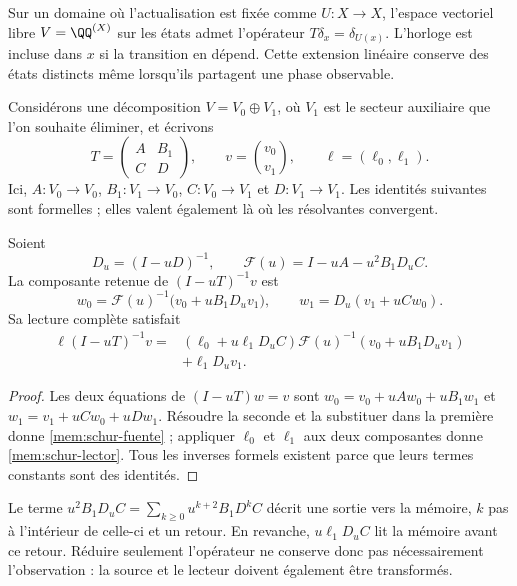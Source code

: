 Sur un domaine où l'actualisation est fixée comme \(U:X\to X\),
l'espace vectoriel libre \(V=\QQ^{(X)}\) sur les états admet l'opérateur
\(T\delta_x=\delta_{U(x)}\). L'horloge est incluse dans \(x\) si la
transition en dépend. Cette extension linéaire conserve des états
distincts même lorsqu'ils partagent une phase observable.

Considérons une décomposition \(V=V_0\oplus V_1\), où \(V_1\)
est le secteur auxiliaire que l'on souhaite éliminer, et écrivons
\[
 T=\begin{pmatrix}A&B_1\\C&D\end{pmatrix},\qquad
 v=\binom{v_0}{v_1},\qquad \ell=(\ell_0,\ell_1).
\]
Ici, \(A:V_0\to V_0\), \(B_1:V_1\to V_0\),
\(C:V_0\to V_1\) et \(D:V_1\to V_1\).
Les identités suivantes sont formelles ; elles valent également là où les
résolvantes convergent.

\begin{proposition}
\label{mem:prop-schur}
Soient
\[
 D_u=(I-uD)^{-1},\qquad
 \mathscr F(u)=I-uA-u^2B_1D_uC.
\]
La composante retenue de \((I-uT)^{-1}v\) est
\begin{equation}
 w_0=\mathscr F(u)^{-1}\bigl(v_0+uB_1D_uv_1\bigr),
 \qquad w_1=D_u(v_1+uCw_0).
 \label{mem:schur-fuente}
\end{equation}
Sa lecture complète satisfait
\begin{equation}
 \begin{split}
 \ell(I-uT)^{-1}v
 ={}&(\ell_0+u\ell_1D_uC)
       \mathscr F(u)^{-1}(v_0+uB_1D_uv_1)\\
    &+\ell_1D_uv_1.
 \end{split}
 \label{mem:schur-lector}
\end{equation}
\end{proposition}
\begin{proof}
Les deux équations de \((I-uT)w=v\) sont
\(w_0=v_0+uAw_0+uB_1w_1\) et
\(w_1=v_1+uCw_0+uDw_1\).
Résoudre la seconde et la substituer dans la première donne
\eqref{mem:schur-fuente} ; appliquer \(\ell_0\) et \(\ell_1\)
aux deux composantes donne \eqref{mem:schur-lector}.
Tous les inverses formels existent parce que leurs termes constants
sont des identités.
\end{proof}

Le terme \(u^2B_1D_uC=\sum_{k\geq0}u^{k+2}B_1D^kC\)
décrit une sortie vers la mémoire, \(k\) pas à l'intérieur de celle-ci et
un retour. En revanche, \(u\ell_1D_uC\) lit la mémoire avant ce
retour. Réduire seulement l'opérateur ne conserve donc pas nécessairement
l'observation : la source et le lecteur doivent également être transformés.

